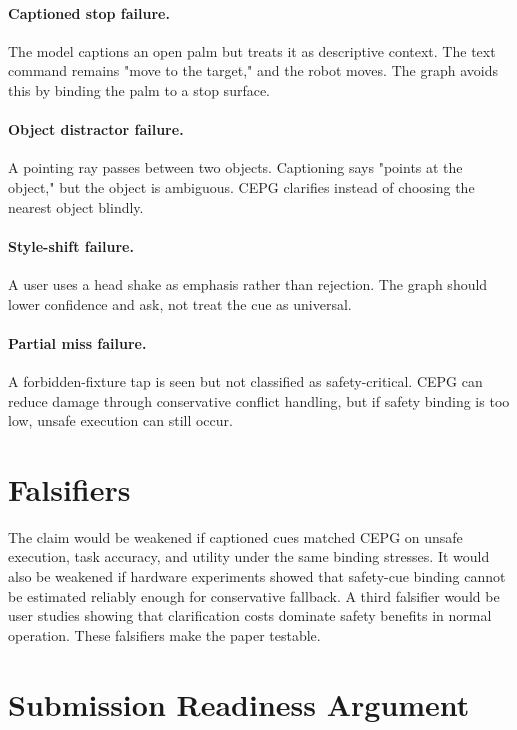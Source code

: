 \documentclass{article}
\newcommand{\method}{CEPG}
\begin{document}
\paragraph{Captioned stop failure.}
The model captions an open palm but treats it as descriptive context. The text command remains "move to the target," and the robot moves. The graph avoids this by binding the palm to a stop surface.

\paragraph{Object distractor failure.}
A pointing ray passes between two objects. Captioning says "points at the object," but the object is ambiguous. \method{} clarifies instead of choosing the nearest object blindly.

\paragraph{Style-shift failure.}
A user uses a head shake as emphasis rather than rejection. The graph should lower confidence and ask, not treat the cue as universal.

\paragraph{Partial miss failure.}
A forbidden-fixture tap is seen but not classified as safety-critical. \method{} can reduce damage through conservative conflict handling, but if safety binding is too low, unsafe execution can still occur.

\section{Falsifiers}

The claim would be weakened if captioned cues matched \method{} on unsafe execution, task accuracy, and utility under the same binding stresses. It would also be weakened if hardware experiments showed that safety-cue binding cannot be estimated reliably enough for conservative fallback. A third falsifier would be user studies showing that clarification costs dominate safety benefits in normal operation. These falsifiers make the paper testable.

\section{Submission Readiness Argument}
\end{document}
